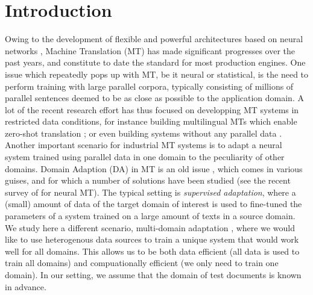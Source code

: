 \documentclass[11pt,a4paper]{article}
\begin{document}
\section{Introduction \label{sec:introduction}}
Owing to the development of flexible and powerful architectures based on neural networks \cite{Cho14properties,Bahdanau15learning,Ghering17convolutional,Vaswani17attention}, Machine Translation (MT) has made significant progresses over the past years, and constitute to date the standard for most production engines. One issue which repeatedly pops up with MT, be it neural or statistical, is the need to perform training with large parallel corpora, typically consisting of millions of parallel sentences deemed to be as close as possible to the application domain. A lot of the recent research effort has thus focused on developping MT systems in restricted data conditions, for instance building multilingual MTs which enable zero-shot translation \cite{Firat16multiway,Johnson17google}; or even building systems without any parallel data \cite{Artetxe18unsupervised,Lample18unsupervised}.
Another important scenario for industrial MT systems is to adapt a neural system trained using parallel data in one domain to the peculiarity of other domains. Domain Adaption (DA) in MT is an old issue \cite{Foster07mixture,Axelrod11domain}, which comes in various guises, and for which a number of solutions have been studied (see the recent survey of \cite{Chu18asurvey} for neural MT). The typical setting is \emph{supervised adaptation}, where a (small) amount of data of the target domain of interest is used to fine-tuned the parameters of a system trained on a large amount of texts in a source domain. We study here a different scenario, multi-domain adaptation \cite{Sennrich13multidomain,Farajian17multidomain}, where we would like to use heterogenous data sources to train a unique system that would work well for all domains. This allows us to be both data efficient (all data is used to train all domains) and compuationally efficient (we only need to train one domain). In our setting, we assume that the domain of test documents is known in advance.
\end{document}
